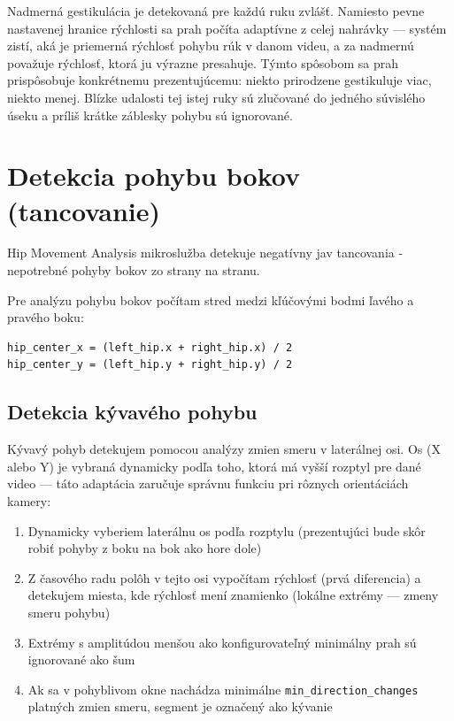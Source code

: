 Nadmerná gestikulácia je detekovaná pre každú ruku zvlášť. Namiesto pevne nastavenej hranice rýchlosti sa prah počíta adaptívne z celej nahrávky --- systém zistí, aká je priemerná rýchlosť pohybu rúk v danom videu, a za nadmernú považuje rýchlosť, ktorá ju výrazne presahuje. Týmto spôsobom sa prah prispôsobuje konkrétnemu prezentujúcemu: niekto prirodzene gestikuluje viac, niekto menej. Blízke udalosti tej istej ruky sú zlučované do jedného súvislého úseku a príliš krátke záblesky pohybu sú ignorované.

\section{Detekcia pohybu bokov (tancovanie)}

Hip Movement Analysis mikroslužba detekuje negatívny jav tancovania - nepotrebné pohyby bokov zo strany na stranu.

Pre analýzu pohybu bokov počítam stred medzi kľúčovými bodmi ľavého a pravého boku:

\begin{verbatim}
hip_center_x = (left_hip.x + right_hip.x) / 2
hip_center_y = (left_hip.y + right_hip.y) / 2
\end{verbatim}

\subsection{Detekcia kývavého pohybu}

Kývavý pohyb detekujem pomocou analýzy zmien smeru v laterálnej osi. Os (X alebo Y) je vybraná dynamicky podľa toho, ktorá má vyšší rozptyl pre dané video --- táto adaptácia zaručuje správnu funkciu pri rôznych orientáciách kamery:

\begin{enumerate}
    \item Dynamicky vyberiem laterálnu os podľa rozptylu (prezentujúci bude skôr robiť pohyby z boku na bok ako hore dole)
    \item Z časového radu polôh v tejto osi vypočítam rýchlosť (prvá diferencia) a detekujem miesta, kde rýchlosť mení znamienko (lokálne extrémy --- zmeny smeru pohybu)
    \item Extrémy s amplitúdou menšou ako konfigurovateľný minimálny prah sú ignorované ako šum
    \item Ak sa v pohyblivom okne nachádza minimálne \texttt{min\_direction\_changes} platných zmien smeru, segment je označený ako kývanie
\end{enumerate}

